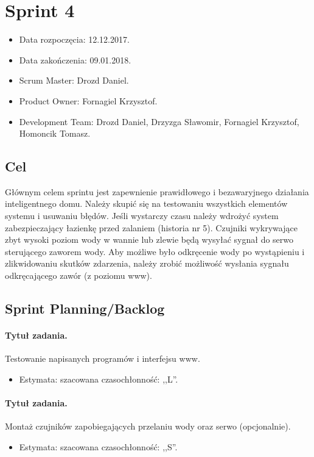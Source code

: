 \section{Sprint 4}
\begin{itemize}
	\item Data rozpoczęcia: 12.12.2017.
	\item Data zakończenia: 09.01.2018.
	\item Scrum Master: Drozd Daniel.
	\item Product Owner: Fornagiel Krzysztof.
	\item Development Team: Drozd Daniel, Drzyzga Sławomir, Fornagiel Krzysztof, Homoncik Tomasz.
\end{itemize}
\subsection{Cel} 

Głównym celem sprintu jest zapewnienie prawidłowego i bezawaryjnego działania inteligentnego domu. Należy skupić się na testowaniu wszystkich elementów systemu i usuwaniu błędów. Jeśli wystarczy czasu należy wdrożyć system zabezpieczający łazienkę przed zalaniem (historia nr 5). Czujniki wykrywające zbyt wysoki poziom wody w wannie lub zlewie będą wysyłać sygnał do serwo sterującego zaworem wody. Aby możliwe było odkręcenie wody po wystąpieniu i zlikwidowaniu skutków zdarzenia, należy zrobić możliwość wysłania sygnału odkręcającego zawór (z poziomu www).


\subsection{Sprint Planning/Backlog}

\paragraph{Tytuł zadania.} Testowanie napisanych programów i interfejsu www.
\begin{itemize}
	\item Estymata: szacowana czasochłonność: ,,L''.
\end{itemize}

\paragraph{Tytuł zadania.} Montaż czujników zapobiegających przelaniu wody oraz serwo (opcjonalnie).
\begin{itemize}
	\item Estymata: szacowana czasochłonność: ,,S''.
\end{itemize}

